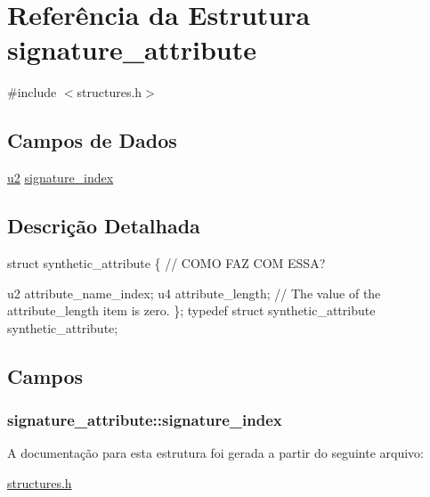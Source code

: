 \hypertarget{structsignature__attribute}{}\section{Referência da Estrutura signature\+\_\+attribute}
\label{structsignature__attribute}


{\ttfamily \#include $<$structures.\+h$>$}

\subsection*{Campos de Dados}
\begin{DoxyCompactItemize}
\item 
\hyperlink{lista__operandos_8h_a732cde1300aafb73b0ea6c2558a7a54f}{u2} \hyperlink{structsignature__attribute_a63a67e73289180add457fbc0ae36413f}{signature\+\_\+index}
\end{DoxyCompactItemize}


\subsection{Descrição Detalhada}
struct synthetic\+\_\+attribute \{ // C\+O\+MO F\+AZ C\+OM E\+S\+SA?

u2 attribute\+\_\+name\+\_\+index; u4 attribute\+\_\+length; // The value of the attribute\+\_\+length item is zero. \}; typedef struct synthetic\+\_\+attribute synthetic\+\_\+attribute; 

\subsection{Campos}
\subsubsection[{\texorpdfstring{signature\+\_\+index}{signature_index}}]{ signature\+\_\+attribute\+::signature\+\_\+index}\hypertarget{structsignature__attribute_a63a67e73289180add457fbc0ae36413f}{}\label{structsignature__attribute_a63a67e73289180add457fbc0ae36413f}


A documentação para esta estrutura foi gerada a partir do seguinte arquivo\+:\begin{DoxyCompactItemize}
\item 
\hyperlink{structures_8h}{structures.\+h}\end{DoxyCompactItemize}
